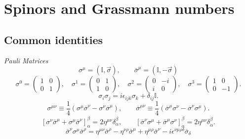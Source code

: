 \chapter{Spinors and Grassmann numbers}
\label{app:notation}

\section{Common identities}
\noindent \textit{Pauli Matrices}
\begin{equation}
\sigma^{\mu}=(\mathbb{I},\overrightarrow{\sigma}),\qquad \bar{\sigma}^{\mu}=(\mathbb{I},-\overrightarrow{\sigma})
\end{equation}
\begin{equation}
\sigma^{0}=\begin{pmatrix}
1 & 0 \\ 0 & 1
\end{pmatrix}
,\quad
\sigma^{1}=\begin{pmatrix}
0 & 1 \\ 1 & 0
\end{pmatrix}
,\quad
\sigma^{2}=\begin{pmatrix}
0 & -i \\ i & 0
\end{pmatrix}
,\quad
\sigma^{3}=\begin{pmatrix}
1 & 0 \\ 0 & -1
\end{pmatrix}.
\end{equation}
\begin{equation}
\sigma_{i} \sigma_{j} = i \epsilon_{ijk} \sigma_{k} + \delta_{ij} \mathbb{I}.
\end{equation}
\begin{equation}
\sigma^{\mu\nu}\equiv \frac{1}{4}\left( \sigma^{\mu}\overline{\sigma}^{\nu} -\sigma^{\nu}\overline{\sigma}^{\mu}\right), \qquad \overline{\sigma}^{\mu\nu}\equiv \frac{1}{4}\left( \overline{\sigma}^{\mu}\sigma^{\nu} -\overline{\sigma}^{\nu}\sigma^{\mu}\right).
\end{equation}
\begin{equation}
\left[ \sigma^{\nu}\bar{\sigma}^{\mu} + \sigma^{\mu}\bar{\sigma}^{\nu} \right]^{\beta}_{\alpha} = 2\eta^{\mu\nu}\delta^{\beta}_{\alpha}, \qquad \left[ \bar{\sigma}^{\nu}\sigma^{\mu} + \bar{\sigma}^{\mu}\sigma^{\nu} \right]^{\dot{\beta}}_{\dot{\alpha}} = 2\eta^{\mu\nu}\delta^{\dot{\beta}}_{\dot{\alpha}}.
\end{equation}
\begin{equation}
\bar{\sigma}^{\nu}\sigma^{\mu}\bar{\sigma}^{\rho} = \eta^{\mu\nu}\bar{\sigma}^{\rho} - \eta^{\nu\rho} \bar{\sigma}^{\mu} + \eta^{\mu\rho} \bar{\sigma}^{\nu} - i\epsilon^{\nu\mu\rho\delta}\bar{\sigma}_{\delta}
\end{equation}
